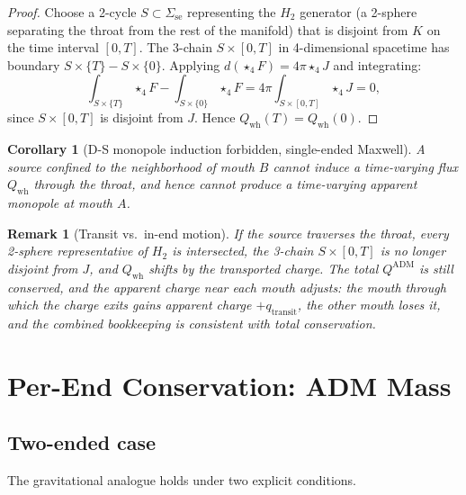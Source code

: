 \documentclass[aps,prd,onecolumn,nofootinbib,superscriptaddress]{revtex4-2}
\newtheorem{corollary}{Corollary}
\newtheorem{remark}{Remark}
\begin{document}
\begin{proof}
Choose a 2-cycle $S\subset\Sigma_{\mathrm{se}}$ representing the $H_2$
generator (a 2-sphere separating the throat from the rest of the manifold)
that is disjoint from $K$ on the time interval $[0,T]$.  The 3-chain
$S\times[0,T]$ in 4-dimensional spacetime has boundary
$S\times\{T\}-S\times\{0\}$.  Applying $d(\star_4 F)=4\pi\star_4 J$ and
integrating:
\begin{equation}
  \int_{S\times\{T\}}\star_4 F - \int_{S\times\{0\}}\star_4 F
  = 4\pi\int_{S\times[0,T]}\star_4 J = 0,
\end{equation}
since $S\times[0,T]$ is disjoint from $J$.  Hence $Q_{\mathrm{wh}}(T)=Q_{\mathrm{wh}}(0)$.
\end{proof}

\begin{corollary}[D-S monopole induction forbidden, single-ended Maxwell]
A source confined to the neighborhood of mouth $B$ cannot induce a
time-varying flux $Q_{\mathrm{wh}}$ through the throat, and hence cannot
produce a time-varying apparent monopole at mouth $A$.
\end{corollary}

\begin{remark}[Transit vs.\ in-end motion]
If the source \emph{traverses} the throat, every 2-sphere representative of
$H_2$ is intersected, the 3-chain $S\times[0,T]$ is no longer disjoint from
$J$, and $Q_{\mathrm{wh}}$ shifts by the transported charge.  The total
$Q^{\mathrm{ADM}}$ is still conserved, and the apparent charge near each mouth
adjusts: the mouth through which the charge exits gains apparent charge
$+q_{\mathrm{transit}}$, the other mouth loses it, and the combined bookkeeping
is consistent with total conservation.
\end{remark}

\section{Per-End Conservation: ADM Mass}
\label{sec:adm}

\subsection{Two-ended case}

The gravitational analogue holds under two explicit conditions.
\end{document}
